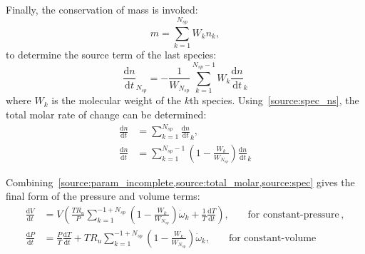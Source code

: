 \documentclass[12pt]{article}
\newcommand{\ns}{\ensuremath{{N_{sp}}}}
\newcommand{\conp}{constant-pressure}
\newcommand{\conv}{constant-volume}
\newcommand{\dconp}{\ensuremath{,\qquad\text{for \conp}}}
\newcommand{\dconv}{\ensuremath{,\qquad\text{for \conv}}}
\begin{document}
Finally, the conservation of mass is invoked:
\begin{equation*}
 m = \sum_{k=1}^{\ns} W_{k} n_{k},
\end{equation*}
to determine the source term of the last species:
\begin{equation}
 \frac{\text{d} n }{\text{d} t }_{\ns} = - \frac{1}{W_{\ns}} \sum_{k=1}^{\ns - 1} W_{k} \frac{\text{d} n }{\text{d} t }_{k}
 \label{source:spec_ns}
\end{equation}
where $W_{k}$ is the molecular weight of the $k$th species.
Using~\eqref{source:spec_ns}, the total molar rate of change can be determined:
\begin{align}
\frac{\text{d} n }{\text{d} t } &= \sum_{k=1}^{\ns} \frac{\text{d} n }{\text{d} t }_{k}, \nonumber \\
\frac{\text{d} n }{\text{d} t } &= \sum_{k=1}^{\ns - 1} \left(1 - \frac{W_{k}}{W_{\ns}}\right) \frac{\text{d} n }{\text{d} t }_{k}
\label{source:total_molar}
\end{align}

Combining~\cref{source:param_incomplete,source:total_molar,source:spec} gives the final form of the pressure and volume terms:
\begin{subequations}
\label{source:param_complete}
\begin{align}
\frac{\text{d} V }{\text{d} t } &= V \left(\frac{T R_u}{P} \sum_{k=1}^{-1 + \ns} \left(1 - \frac{W_{k}}{W_{\ns}}\right) \dot{\omega}_{k} + \frac{1}{T} \frac{\text{d} T }{\text{d} t }\right)\dconp, \\
\frac{\text{d} P }{\text{d} t } &= \frac{P}{T} \frac{\text{d} T }{\text{d} t } + T R_u \sum_{k=1}^{-1 + \ns} \left(1 - \frac{W_{k}}{W_{\ns}}\right) \dot{\omega}_{k}\dconv
\end{align}
\end{subequations}




\printbibliography 
\end{document}
